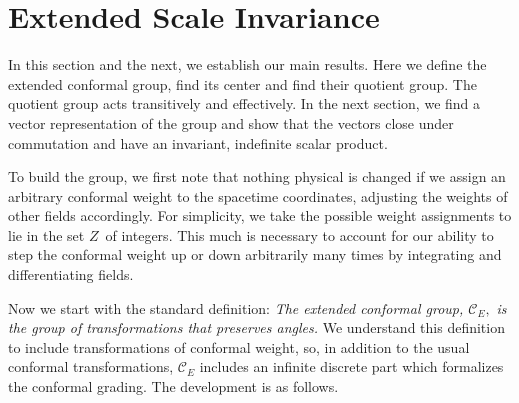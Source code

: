 \documentclass[a4paper,12pt]{article}
\begin{document}
\section{Extended Scale Invariance}

In this section and the next, we establish our main results. Here we define
the extended conformal group, find its center and find their quotient group.
The quotient group acts transitively and effectively. In the next section,
we find a vector representation of the group and show that the vectors close
under commutation and have an invariant, indefinite scalar product.

To build the group, we first note that nothing physical is changed if we
assign an arbitrary conformal weight to the spacetime coordinates, adjusting
the weights of other fields accordingly. For simplicity, we take the
possible weight assignments to lie in the set $Z$\ of integers. This much is
necessary to account for our ability to step the conformal weight up or down
arbitrarily many times by integrating and differentiating fields.

Now we start with the standard definition: \textit{The extended conformal
group, $\mathcal{C}_{E},$} \textit{is the group of transformations that
preserves angles.} We understand this definition to include transformations
of conformal weight, so, in addition to the usual conformal transformations, 
$\mathcal{C}_{E}$ includes an infinite discrete part which formalizes the
conformal grading. The development is as follows.
\end{document}
